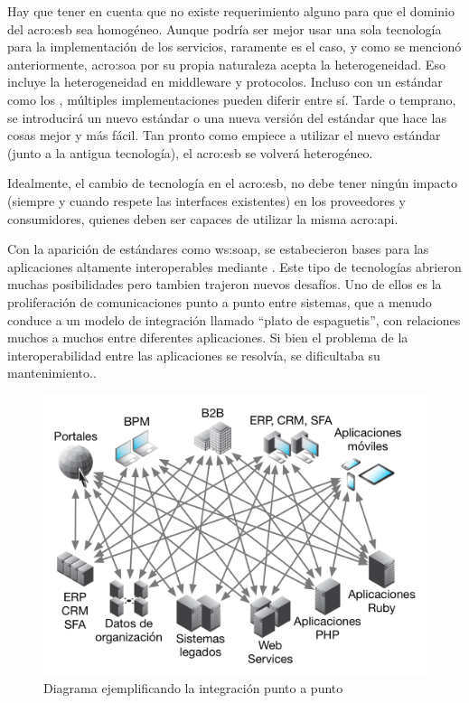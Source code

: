 Hay que tener en cuenta que no existe requerimiento alguno para que el dominio del \gls{acro:esb} sea homogéneo. Aunque podría ser mejor usar una sola tecnología para la implementación de los servicios, raramente es el caso, y como se mencionó anteriormente, \gls{acro:soa} por su propia naturaleza acepta la heterogeneidad. Eso incluye la heterogeneidad en middleware y protocolos. Incluso con un estándar como los , múltiples implementaciones pueden diferir entre sí. Tarde o temprano, se introducirá un nuevo estándar o una nueva versión del estándar que hace las cosas mejor y más fácil. Tan pronto como empiece a utilizar el nuevo estándar (junto a la antigua tecnología), el \gls{acro:esb} se volverá heterogéneo\cite[p.~49]{josuttis2007}.

Idealmente, el cambio de tecnología en el \gls{acro:esb}, no debe tener ningún impacto (siempre y cuando respete las interfaces existentes) en los proveedores y consumidores, quienes deben ser capaces de utilizar la misma \gls{acro:api}.

Con la aparición de estándares como \gls{ws:soap}, se estabecieron bases para las aplicaciones altamente interoperables mediante . Este tipo de tecnologías abrieron muchas posibilidades pero tambien trajeron nuevos desafíos. Uno de ellos es la proliferación de comunicaciones punto a punto entre sistemas, que a menudo conduce a un modelo de integración llamado ``plato de espaguetis'', con relaciones muchos a muchos entre diferentes aplicaciones. Si bien el problema de la interoperabilidad entre las aplicaciones se resolvía, se dificultaba su mantenimiento.\cite[p.~4]{dossotandemic2010}.

\begin{figure}[H]
  \includegraphics[width=\linewidth]{src/images/02-capitulo-2/integracion-p2p.png}
  \caption{Diagrama ejemplificando la integración punto a punto}
  \label{fig:point-to-point-integration}
\end{figure}


